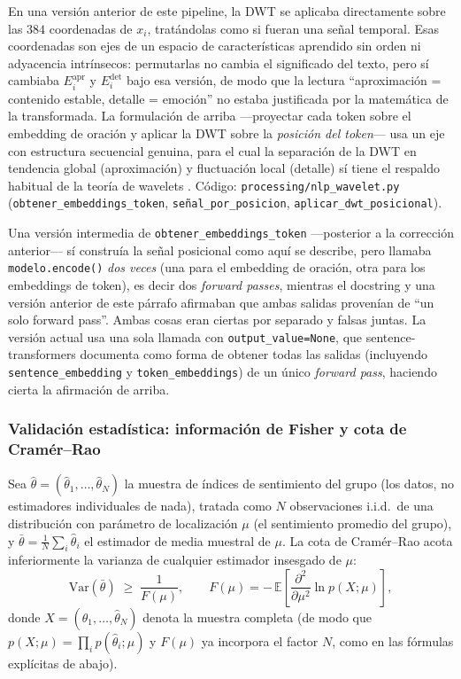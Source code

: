 \documentclass[11pt,a4paper,oneside]{article}
\theoremstyle{definition}
\begin{document}
\begin{implBox}[title=Corrección de diseño]
En una versión anterior de este pipeline, la DWT se aplicaba directamente sobre las $384$
coordenadas de $x_i$, tratándolas como si fueran una señal temporal. Esas coordenadas son ejes
de un espacio de características aprendido sin orden ni adyacencia intrínsecos: permutarlas no
cambia el significado del texto, pero sí cambiaba $E^{\mathrm{apr}}_i$ y $E^{\mathrm{det}}_i$
bajo esa versión, de modo que la lectura ``aproximación = contenido estable, detalle = emoción''
no estaba justificada por la matemática de la transformada. La formulación de arriba —proyectar
cada token sobre el embedding de oración y aplicar la DWT sobre la \emph{posición del token}—
usa un eje con estructura secuencial genuina, para el cual la separación de la DWT en
tendencia global (aproximación) y fluctuación local (detalle) sí tiene el respaldo habitual de
la teoría de wavelets \cite{Mallat1989}. Código: \texttt{processing/nlp\_wavelet.py}
(\texttt{obtener\_embeddings\_token}, \texttt{señal\_por\_posicion},
\texttt{aplicar\_dwt\_posicional}).

Una versión intermedia de \texttt{obtener\_embeddings\_token} —posterior a la corrección
anterior— sí construía la señal posicional como aquí se describe, pero llamaba
\texttt{modelo.encode()} \emph{dos veces} (una para el embedding de oración, otra para los
embeddings de token), es decir dos \emph{forward passes}, mientras el docstring y una versión
anterior de este párrafo afirmaban que ambas salidas provenían de ``un solo forward pass''.
Ambas cosas eran ciertas por separado y falsas juntas. La versión actual usa una sola llamada
con \texttt{output\_value=None}, que sentence-transformers documenta como forma de obtener
todas las salidas (incluyendo \texttt{sentence\_embedding} y \texttt{token\_embeddings}) de un
único \emph{forward pass}, haciendo cierta la afirmación de arriba.
\end{implBox}

\subsubsection{Validación estadística: información de Fisher y cota de Cramér--Rao}
\label{sec:crb}

Sea $\hat\theta = (\hat\theta_1,\ldots,\hat\theta_N)$ la muestra de índices de sentimiento del
grupo (los datos, no estimadores individuales de nada), tratada como $N$ observaciones
i.i.d.\ de una distribución con parámetro de localización $\mu$ (el sentimiento promedio del
grupo), y $\bar\theta = \frac1N\sum_i \hat\theta_i$ el estimador de media muestral de $\mu$. La
cota de Cramér--Rao \cite{Fisher1922,Rao1945,Cramer1946} acota inferiormente la varianza de
cualquier estimador insesgado de $\mu$:
\[
\mathrm{Var}(\bar\theta) \;\ge\; \frac{1}{F(\mu)},
\qquad
F(\mu) = -\,\mathbb{E}\!\left[\frac{\partial^2}{\partial\mu^2}\ln p(X;\mu)\right],
\]
donde $X=(\hat\theta_1,\ldots,\hat\theta_N)$ denota la muestra completa (de modo que
$p(X;\mu)=\prod_i p(\hat\theta_i;\mu)$ y $F(\mu)$ ya incorpora el factor $N$, como en las
fórmulas explícitas de abajo).
\end{document}
